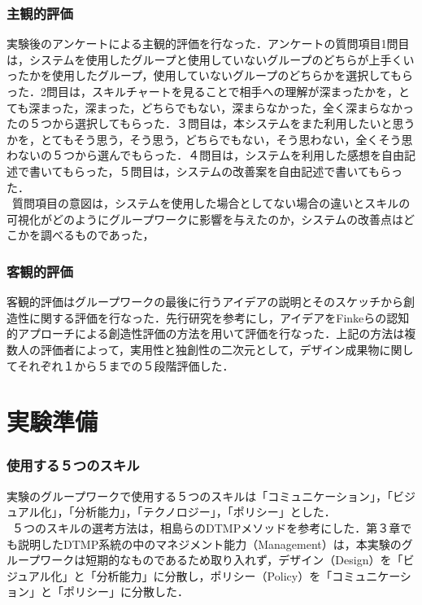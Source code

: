 \documentclass{funthesis}
\begin{document}
\subsubsection{主観的評価}
実験後のアンケートによる主観的評価を行なった．アンケートの質問項目1問目は，システムを使用したグループと使用していないグループのどちらが上手くいったかを使用したグループ，使用していないグループのどちらかを選択してもらった．2問目は，スキルチャートを見ることで相手への理解が深まったかを，とても深まった，深まった，どちらでもない，深まらなかった，全く深まらなかったの５つから選択してもらった．３問目は，本システムをまた利用したいと思うかを，とてもそう思う，そう思う，どちらでもない，そう思わない，全くそう思わないの５つから選んでもらった．４問目は，システムを利用した感想を自由記述で書いてもらった，５問目は，システムの改善案を自由記述で書いてもらった．\\
\ 質問項目の意図は，システムを使用した場合としてない場合の違いとスキルの可視化がどのようにグループワークに影響を与えたのか，システムの改善点はどこかを調べるものであった，　　　　　　　　　　　　　　　　　　　　　　　　　　　　　　　　　　　　　　　　　　　　　　　　　　　　　　　　　
\subsubsection{客観的評価}
客観的評価はグループワークの最後に行うアイデアの説明とそのスケッチから創造性に関する評価を行なった．先行研究\cite{A18}を参考にし，アイデアをFinkeら\cite{A19}の認知的アプローチによる創造性評価の方法を用いて評価を行なった．上記の方法は複数人の評価者によって，実用性と独創性の二次元として，デザイン成果物に関してそれぞれ１から５までの５段階評価した．

\section{実験準備}
\subsubsection{使用する５つのスキル}
実験のグループワークで使用する５つのスキルは「コミュニケーション」，「ビジュアル化」，「分析能力」，「テクノロジー」，「ポリシー」とした．\\
\ ５つのスキルの選考方法は，相島ら\cite{A5}のDTMPメソッドを参考にした．第３章でも説明したDTMP系統の中のマネジメント能力（Management）は，本実験のグループワークは短期的なものであるため取り入れず，デザイン（Design）を「ビジュアル化」と「分析能力」に分散し，ポリシー（Policy）を「コミュニケーション」と「ポリシー」に分散した．
\end{document}
